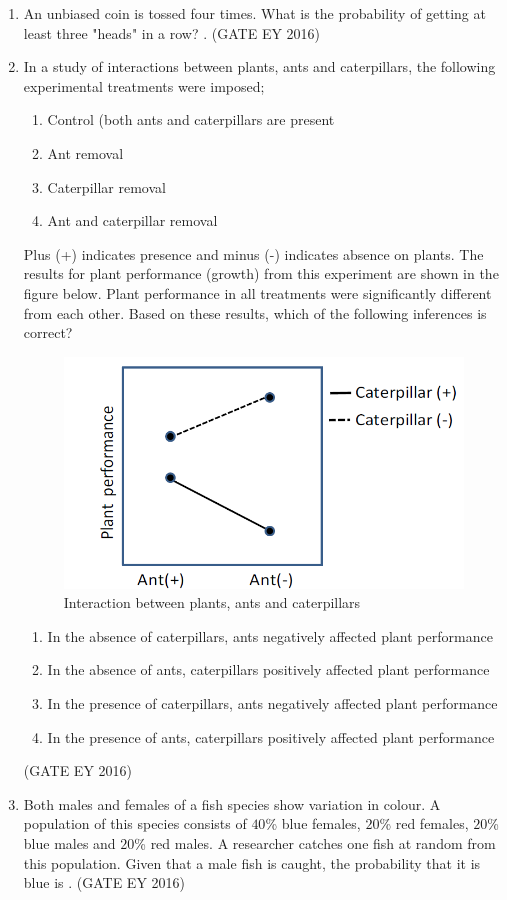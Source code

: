 \documentclass[journal]{IEEEtran}
\begin{document}
\begin{enumerate}[label=Q.\arabic*.]
\item An unbiased coin is tossed four times. What is the probability of getting at least three "heads" in a row? \underline{\hspace{3cm}}.
\hfill{(GATE EY 2016)}
\bigskip 
\item In a study of interactions between plants, ants and caterpillars, the following experimental treatments were imposed;
\begin{enumerate}[label=(\roman*)]
        \item Control (both ants and caterpillars are present
        \item Ant removal
        \item Caterpillar removal
        \item Ant and caterpillar removal
    \end{enumerate}
Plus (+) indicates presence and minus (-) indicates absence on plants. The results for plant performance (growth) from this experiment are shown in the figure below. Plant performance in all treatments were significantly different from each other. Based on these results, which of the following inferences is correct? 
\begin{figure}
    \centering
    \includegraphics[width=0.5\linewidth]{figs/Q-48.png}
    \caption{Interaction between plants, ants and caterpillars}
    \label{Fig.6}
\end{figure}
\begin{enumerate}
    \item In the absence of caterpillars, ants negatively affected plant performance
    \item In the absence of ants, caterpillars positively affected plant performance
    \item In the presence of caterpillars, ants negatively affected plant performance
    \item In the presence of ants, caterpillars positively affected plant performance
\end{enumerate}
\hfill{(GATE EY 2016)}

\item Both males and females of a fish species show variation in colour. A population of this species consists of $40$\% blue females, $20$\% red females, $20$\% blue males and $20$\% red males. A researcher catches one fish at random from this population. Given that a male fish is caught, the probability that it is blue is \underline{\hspace{3cm}}.
\hfill{(GATE EY 2016)}


\end{enumerate}
\end{document}
